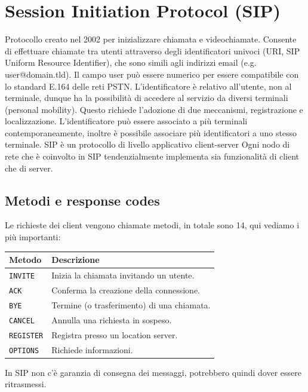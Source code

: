 \section{Session Initiation Protocol (SIP)}
Protocollo creato nel 2002 per inizializzare chiamata e videochiamate.
Consente di effettuare chiamate tra utenti attraverso degli identificatori univoci (URI,  SIP Uniform Resource Identifier),
che sono simili agli indirizzi email (e.g. user@domain.tld).
Il campo user può essere numerico per essere compatibile con lo standard E.164 delle reti PSTN.
L'identificatore è relativo all'utente, non al terminale, dunque ha la possibilità di accedere al servizio da diversi terminali (personal mobility).
Questo richiede l'adozione di due meccanismi, registrazione e localizzazione.
L'identificatore può essere associato a più terminali contemporaneamente, inoltre è possibile associare più identificatori a uno stesso terminale.
SIP è un protocollo di livello applicativo client-server
Ogni nodo di rete che è coinvolto in SIP tendenzialmente implementa sia funzionalità di client che di server.
\subsection{Metodi e response codes}
Le richieste dei client vengono chiamate metodi, in totale sono 14, qui vediamo i più importanti:
\begin{table}[H]
	\begin{tabular}{l|l}
		\textbf{Metodo} & \textbf{Descrizione} \\ \hline
		\texttt{INVITE} & Inizia la chiamata invitando un utente. \\
		\texttt{ACK} & Conferma la creazione della connessione. \\
		\texttt{BYE} & Termine (o trasferimento) di una chiamata. \\
		\texttt{CANCEL} & Annulla una richiesta in sospeso. \\
		\texttt{REGISTER} & Registra presso un location server. \\
		\texttt{OPTIONS} & Richiede informazioni. \\
	\end{tabular}
\end{table}\noindent
In SIP non c'è garanzia di consegna dei messaggi, potrebbero quindi dover essere ritrasmessi.

